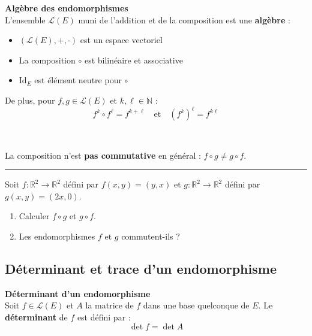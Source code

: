 \documentclass[../PolyS4.tex]{subfiles}
\begin{document}
\begin{Prop}\textbf{Algèbre des endomorphismes}\\

L'ensemble $\mathcal{L}(E)$ muni de l'addition et de la composition est une \textbf{algèbre} :
\begin{itemize}
    \item $(\mathcal{L}(E), +, \cdot)$ est un espace vectoriel
    \item La composition $\circ$ est bilinéaire et associative
    \item $\text{Id}_E$ est élément neutre pour $\circ$
\end{itemize}
De plus, pour $f, g \in \mathcal{L}(E)$ et $k, \ell \in \mathbb{N}$ :
$$f^k \circ f^\ell = f^{k+\ell} \quad \text{et} \quad (f^k)^\ell = f^{k\ell}$$
\end{Prop}

\begin{Rmq}$\,$

La composition n'est \textbf{pas commutative} en général : $f \circ g \neq g \circ f$.
\end{Rmq}

\vspace{1em}
\hrule
\vspace{1em}


Soit $f : \mathbb{R}^2 \to \mathbb{R}^2$ défini par $f(x, y) = (y, x)$ et $g : \mathbb{R}^2 \to \mathbb{R}^2$ défini par $g(x, y) = (2x, 0)$.
\begin{enumerate}
    \item Calculer $f \circ g$ et $g \circ f$.
    \item Les endomorphismes $f$ et $g$ commutent-ils ?
\end{enumerate}

\newpage

\subsection{Déterminant et trace d'un endomorphisme}

\begin{Def}\textbf{Déterminant d'un endomorphisme}\\

Soit $f \in \mathcal{L}(E)$ et $A$ la matrice de $f$ dans une base quelconque de $E$. Le \textbf{déterminant} de $f$ est défini par :
$$\det f = \det A$$
\end{Def}
\end{document}
